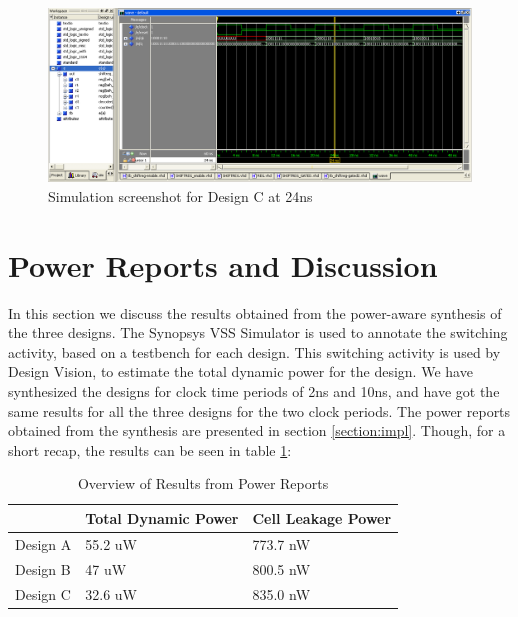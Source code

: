 \documentclass[11pt,a4paper]{article}
\begin{document}
\begin{figure}[htp]
\centering
\includegraphics[length = 4in,width = 6.5in]{./images/simsrg2.png}
\caption{Simulation screenshot for Design C at 24ns}
\end{figure}

\newpage
\section{Power Reports and Discussion}
\label{section:power}

In this section we discuss the results obtained from the power-aware synthesis of the three designs. The Synopsys VSS Simulator is used to annotate the switching activity, based on a testbench for each design. This switching activity is used by Design Vision, to estimate the total dynamic power for the design. We have synthesized the designs for clock time periods of 2ns and 10ns, and have got the same results for all the three designs for the two clock periods. The power reports obtained from the synthesis are presented in section \ref{section:impl}. Though, for a short recap, the results can be seen in table \ref{table:power}:

\begin{table}[htbp]
\begin{center}
\begin{tabular}{|l|l|l|}
\hline
\textbf{}	& \textbf{Total Dynamic Power}		& \textbf{Cell Leakage Power}\\ \hline
Design A &	55.2 uW				& 773.7 nW \\ \hline
Design B &	47 uW					& 800.5 nW \\ \hline
Design C &  32.6 uW				& 835.0 nW \\ \hline
\end{tabular}
\end{center}
\caption{Overview of Results from Power Reports}
\label{table:power}
\end{table}
\end{document}

